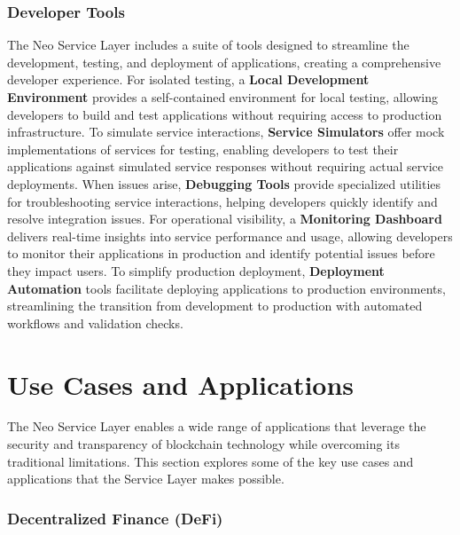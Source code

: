 \documentclass[11pt]{article}
\begin{document}
\subsubsection{Developer Tools}
\label{subsubsec:developer-tools}

The Neo Service Layer includes a suite of tools designed to streamline the development, testing, and deployment of applications, creating a comprehensive developer experience. For isolated testing, a \textbf{Local Development Environment} provides a self-contained environment for local testing, allowing developers to build and test applications without requiring access to production infrastructure. To simulate service interactions, \textbf{Service Simulators} offer mock implementations of services for testing, enabling developers to test their applications against simulated service responses without requiring actual service deployments. When issues arise, \textbf{Debugging Tools} provide specialized utilities for troubleshooting service interactions, helping developers quickly identify and resolve integration issues. For operational visibility, a \textbf{Monitoring Dashboard} delivers real-time insights into service performance and usage, allowing developers to monitor their applications in production and identify potential issues before they impact users. To simplify production deployment, \textbf{Deployment Automation} tools facilitate deploying applications to production environments, streamlining the transition from development to production with automated workflows and validation checks.

\section{Use Cases and Applications}
\label{subsec:nsl-use-cases}

The Neo Service Layer enables a wide range of applications that leverage the security and transparency of blockchain technology while overcoming its traditional limitations. This section explores some of the key use cases and applications that the Service Layer makes possible.

\subsubsection{Decentralized Finance (DeFi)}
\label{subsubsec:defi}
\end{document}

